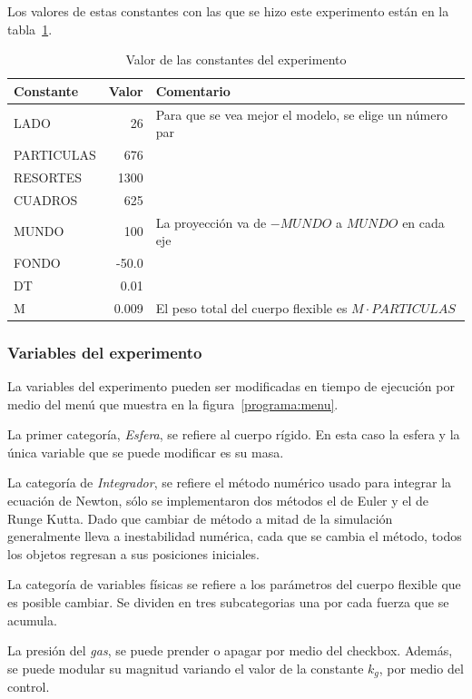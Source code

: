 Los valores de estas constantes con las que se hizo este experimento están en la tabla~\ref{valores:constantes}.
\begin{table}
\begin{center}
\begin{tabular} {@{}lrp{10cm}@{}}
\toprule
Constante & Valor & Comentario\\ 
\midrule
 LADO & 26 & Para que se vea mejor el modelo, se elige un número par\\
 PARTICULAS & 676 &  \\
 RESORTES & 1300 & \\
 CUADROS & 625 & \\ 
\midrule
 MUNDO & 100 & La proyección va de $-MUNDO$ a $MUNDO$ en cada eje\\
 FONDO & -50.0 & \\ 
\midrule 
 DT & 0.01 & \\ 
\midrule
 M & 0.009 & El peso total del cuerpo flexible es $M \cdot PARTICULAS$ \\
\bottomrule
\end{tabular}
\caption[Tabla con los valores de las constantes durante el experimento]{Valor de las constantes del experimento}
\label{valores:constantes}
\end{center}
\end{table}

\subsubsection{Variables del experimento}
La variables del experimento pueden ser modificadas en tiempo de ejecución por medio del menú que muestra en la figura~\ref{programa:menu}.

La primer categoría, \emph{Esfera}, se refiere al cuerpo rígido. En esta caso la esfera y la única variable que se puede modificar es su masa.

La categoría de \emph{Integrador}, se refiere el método numérico usado para integrar la ecuación de Newton, sólo se implementaron dos métodos el de Euler y el de Runge Kutta. Dado que cambiar de método a mitad de la simulación generalmente lleva a inestabilidad numérica, cada que se cambia el método, todos los objetos regresan a sus posiciones iniciales.

La categoría de variables físicas se refiere a los parámetros del cuerpo flexible que es posible cambiar. Se dividen en tres subcategorias una por cada fuerza que se acumula.

La presión del \emph{gas}, se puede prender o apagar por medio del checkbox. Además, se puede modular su magnitud variando el valor de la constante $k_{g}$, por medio del control.

